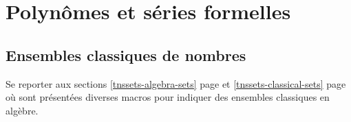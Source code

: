 \documentclass[12pt,a4paper]{article}
\begin{document}
\chapter{Polynômes et séries formelles}

\section{Ensembles classiques de nombres}

Se reporter aux sections
\ref{tnssets-algebra-sets} page \pageref{tnssets-algebra-sets}
et
\ref{tnssets-classical-sets} page \pageref{tnssets-classical-sets}
où sont présentées diverses macros pour indiquer des ensembles classiques en algèbre.
\end{document}
